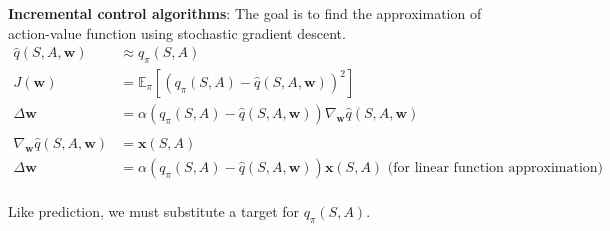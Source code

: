 \noindent \textbf{Incremental control algorithms}: The goal is to find the
approximation of action-value function using stochastic gradient descent.
\begin{align*}
    \hat{q}(S, A, \mathbf{w})                   & \approx q_\pi(S, A)                                                                                             \\
    J(\mathbf{w})                               & = \mathbb{E}_\pi \left[ (q_\pi(S, A) - \hat{q}(S, A, \mathbf{w}))^2 \right]                                     \\
    \Delta \mathbf{w}                           & = \alpha (q_\pi(S, A) - \hat{q}(S, A, \mathbf{w})) \nabla_\mathbf{w} \hat{q}(S, A, \mathbf{w})                  \\
    \\
    \nabla_\mathbf{w} \hat{q}(S, A, \mathbf{w}) & = \mathbf{x}(S, A)                                                                                              \\
    \Delta \mathbf{w}                           & = \alpha (q_\pi(S, A) - \hat{q}(S, A, \mathbf{w})) \mathbf{x}(S, A) \text{ (for linear function approximation)} \\
\end{align*}

\noindent Like prediction, we must substitute a target for $q_\pi(S, A)$.

